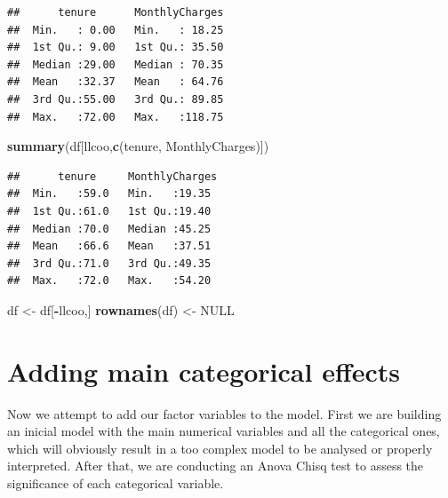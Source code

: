 \documentclass[
]{article}
\newenvironment{Shaded}{\begin{snugshade}}{\end{snugshade}}
\newcommand{\ConstantTok}[1]{\textcolor[rgb]{0.56,0.35,0.01}{#1}}
\newcommand{\FunctionTok}[1]{\textcolor[rgb]{0.13,0.29,0.53}{\textbf{#1}}}
\newcommand{\NormalTok}[1]{#1}
\newcommand{\OtherTok}[1]{\textcolor[rgb]{0.56,0.35,0.01}{#1}}
\newcommand{\SpecialCharTok}[1]{\textcolor[rgb]{0.81,0.36,0.00}{\textbf{#1}}}
\newcommand{\StringTok}[1]{\textcolor[rgb]{0.31,0.60,0.02}{#1}}
\begin{document}
\begin{verbatim}
##      tenure      MonthlyCharges  
##  Min.   : 0.00   Min.   : 18.25  
##  1st Qu.: 9.00   1st Qu.: 35.50  
##  Median :29.00   Median : 70.35  
##  Mean   :32.37   Mean   : 64.76  
##  3rd Qu.:55.00   3rd Qu.: 89.85  
##  Max.   :72.00   Max.   :118.75
\end{verbatim}

\begin{Shaded}
\begin{Highlighting}[]
\FunctionTok{summary}\NormalTok{(df[llcoo,}\FunctionTok{c}\NormalTok{(}\StringTok{\textquotesingle{}tenure\textquotesingle{}}\NormalTok{, }\StringTok{\textquotesingle{}MonthlyCharges\textquotesingle{}}\NormalTok{)])}
\end{Highlighting}
\end{Shaded}

\begin{verbatim}
##      tenure     MonthlyCharges 
##  Min.   :59.0   Min.   :19.35  
##  1st Qu.:61.0   1st Qu.:19.40  
##  Median :70.0   Median :45.25  
##  Mean   :66.6   Mean   :37.51  
##  3rd Qu.:71.0   3rd Qu.:49.35  
##  Max.   :72.0   Max.   :54.20
\end{verbatim}

\begin{Shaded}
\begin{Highlighting}[]
\NormalTok{df }\OtherTok{\textless{}{-}}\NormalTok{ df[}\SpecialCharTok{{-}}\NormalTok{llcoo,]}
\FunctionTok{rownames}\NormalTok{(df) }\OtherTok{\textless{}{-}} \ConstantTok{NULL}
\end{Highlighting}
\end{Shaded}

\hypertarget{adding-main-categorical-effects}{%
\section{Adding main categorical
effects}\label{adding-main-categorical-effects}}

Now we attempt to add our factor variables to the model. First we are
building an inicial model with the main numerical variables and all the
categorical ones, which will obviously result in a too complex model to
be analysed or properly interpreted. After that, we are conducting an
Anova Chisq test to assess the significance of each categorical
variable.
\end{document}
